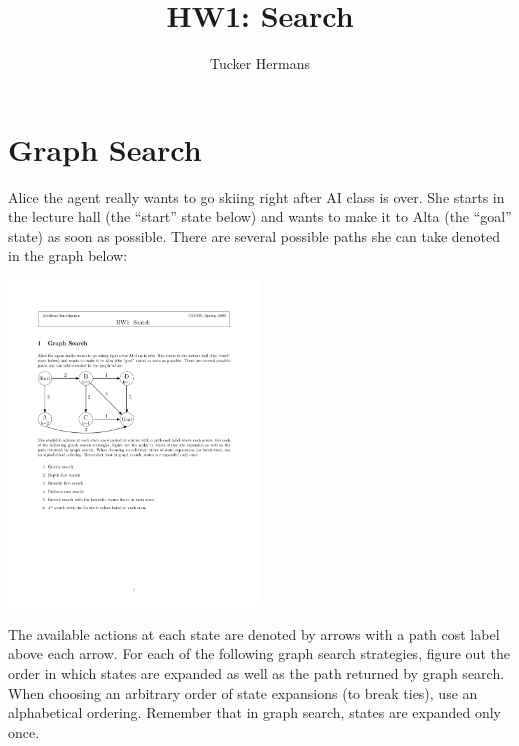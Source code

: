 
\usepackage{notes}
\usepackage{url}
\usepackage{graphicx}
\title{HW1: Search}
\duedate{}
\author{Tucker Hermans}



\maketitle
\section{Graph Search}

Alice the agent really wants to go skiing right after AI class is
over.  She starts in the lecture hall (the ``start'' state below) and
wants to make it to Alta (the ``goal'' state) as soon as possible.
There are several possible paths she can take denoted in the graph
below:

\includegraphics[width=0.5\textwidth]{hw1-statespace}

The available actions at each state are denoted by arrows with a path
cost label above each arrow.  For each of the following graph search
strategies, figure out the order in which states are expanded as well
as the path returned by graph search.  When choosing an arbitrary
order of state expansions (to break ties), use an alphabetical
ordering.  Remember that in graph search, states are expanded only
once.

